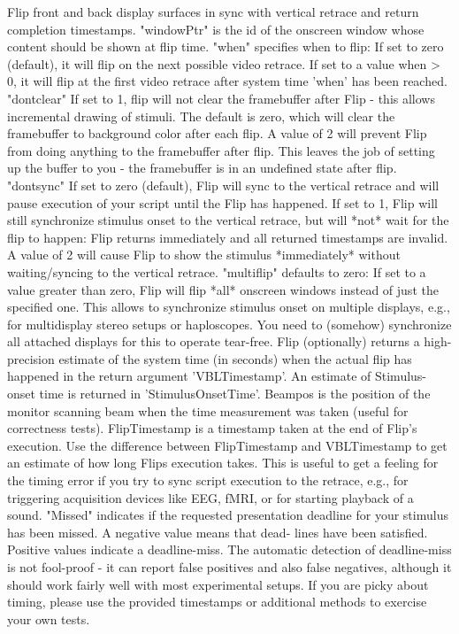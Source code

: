 Flip front and back display surfaces in sync with vertical retrace and return
completion timestamps.
"windowPtr" is the id of the onscreen window whose content should be shown at
flip time. "when" specifies when to flip: If set to zero (default), it will flip
on the next possible video retrace. If set to a value when > 0, it will flip at
the first video retrace after system time 'when' has been reached. "dontclear"
If set to 1, flip will not clear the framebuffer after Flip - this allows
incremental drawing of stimuli. The default is zero, which will clear the
framebuffer to background color after each flip. A value of 2 will prevent Flip
from doing anything to the framebuffer after flip. This leaves the job of
setting up the buffer to you - the framebuffer is in an undefined state after
flip. "dontsync" If set to zero (default), Flip will sync to the vertical
retrace and will pause execution of your script until the Flip has happened. If
set to 1, Flip will still synchronize stimulus onset to the vertical retrace,
but will *not* wait for the flip to happen: Flip returns immediately and all
returned timestamps are invalid. A value of 2 will cause Flip to show the
stimulus *immediately* without waiting/syncing to the vertical retrace.
"multiflip" defaults to zero: If set to a value greater than zero, Flip will
flip *all* onscreen windows instead of just the specified one. This allows to
synchronize stimulus onset on multiple displays, e.g., for multidisplay stereo
setups or haploscopes. You need to (somehow) synchronize all attached displays
for this to operate tear-free. Flip (optionally) returns a high-precision
estimate of the system time (in seconds) when the actual flip has happened in
the return argument 'VBLTimestamp'. An estimate of Stimulus-onset time is
returned in 'StimulusOnsetTime'. Beampos is the position of the monitor scanning
beam when the time measurement was taken (useful for correctness tests).
FlipTimestamp is a timestamp taken at the end of Flip's execution. Use the
difference between FlipTimestamp and VBLTimestamp to get an estimate of how long
Flips execution takes. This is useful to get a feeling for the timing error if
you try to sync script execution to the retrace, e.g., for triggering
acquisition devices like EEG, fMRI, or for starting playback of a sound.
"Missed" indicates if the requested presentation deadline for your stimulus has
been missed. A negative value means that dead- lines have been satisfied.
Positive values indicate a deadline-miss. The automatic detection of
deadline-miss is not fool-proof - it can report false positives and also false
negatives, although it should work fairly well with most experimental setups. If
you are picky about timing, please use the provided timestamps or additional
methods to exercise your own tests. 
